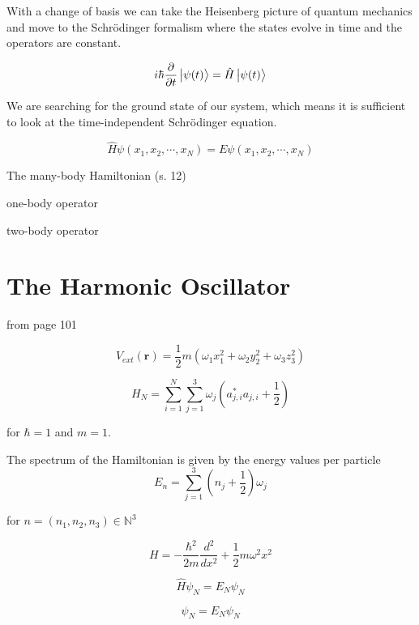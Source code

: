 With a change of basis we can take the Heisenberg picture of quantum mechanics and move to the Schrödinger formalism where the states evolve in time and the operators are constant. 

\begin{equation}
i \hbar \frac{\partial}{\partial t} \ket{\psi(t)} = \hat{H} \ket{\psi(t)}
\end{equation}

We are searching for the ground state of our system, which means it is sufficient to look at the time-independent Schrödinger equation.

\begin{equation}
\hat{H} \psi(x_1, x_2, \cdots, x_N) = E \psi (x_1, x_2, \cdots, x_N)
\end{equation}

The many-body Hamiltonian (s. 12) 

one-body operator  

two-body operator

\section{The Harmonic Oscillator}

from page 101 \cite{verbeure2010many}

\begin{equation}
V_{ext}(\textbf{r}) = \frac{1}{2} m (\omega_1 x_1^2 + \omega_2 y_2^2 + \omega_3 z_3^2)
\end{equation}

\begin{equation}
H_N = \sum^N_{i=1} \sum^3_{j=1} \omega_j \left( a_{j,i}^{\ast} a_{j,i} + \frac{1}{2} \right)
\end{equation}

for $\hbar = 1$ and $m = 1$.

The spectrum of the Hamiltonian is given by the energy values per particle 
\begin{equation}
E_n =  \sum^3_{j=1} \left( n_j + \frac{1}{2} \right) \omega_j
\end{equation}

for $n = (n_1, n_2, n_3) \in \mathbb{N}^3$

\begin{equation} \label{eq:harmonic_oscillator}
H = -\frac{\hbar^2}{2m} \frac{d^2}{dx^2} + \frac{1}{2} m\omega^2 x^2
\end{equation}

\begin{equation}
\hat{H} \psi_N = E_N \psi_N
\end{equation}

\begin{equation}
\psi_N = E_N \psi_N
\end{equation}

